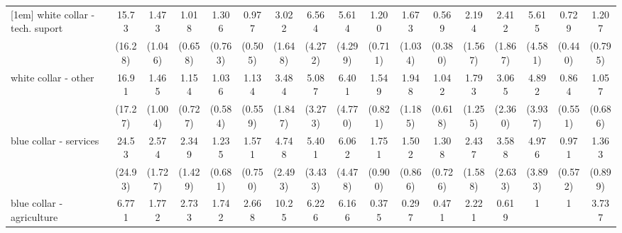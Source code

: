 {\begin{tabular}{l*{16}{c}}
[1em]
white collar - tech. suport&       15.73\sym{**} &       1.473         &       1.018         &       1.306         &       0.977         &       3.022\sym{*}  &       6.564\sym{**} &       5.614\sym{*}  &       1.200         &       1.673         &       0.569         &       2.194         &       2.412         &       5.615\sym{*}  &       0.729         &       1.207         \\
                    &     (16.28)         &     (1.046)         &     (0.658)         &     (0.763)         &     (0.505)         &     (1.648)         &     (4.272)         &     (4.299)         &     (0.711)         &     (1.034)         &     (0.380)         &     (1.567)         &     (1.867)         &     (4.581)         &     (0.440)         &     (0.795)         \\
[1em]
white collar - other&       16.91\sym{**} &       1.465         &       1.154         &       1.036         &       1.134         &       3.484\sym{*}  &       5.087\sym{*}  &       6.401\sym{*}  &       1.549         &       1.948         &       1.042         &       1.793         &       3.065         &       4.892\sym{*}  &       0.864         &       1.057         \\
                    &     (17.27)         &     (1.004)         &     (0.727)         &     (0.584)         &     (0.559)         &     (1.847)         &     (3.273)         &     (4.770)         &     (0.821)         &     (1.185)         &     (0.618)         &     (1.255)         &     (2.360)         &     (3.937)         &     (0.551)         &     (0.686)         \\
[1em]
blue collar - services&       24.53\sym{**} &       2.574         &       2.349         &       1.235         &       1.571         &       4.748\sym{**} &       5.401\sym{**} &       6.062\sym{*}  &       1.751         &       1.502         &       1.308         &       2.437         &       3.588         &       4.976\sym{*}  &       0.971         &       1.363         \\
                    &     (24.93)         &     (1.727)         &     (1.429)         &     (0.681)         &     (0.750)         &     (2.493)         &     (3.433)         &     (4.478)         &     (0.900)         &     (0.866)         &     (0.726)         &     (1.588)         &     (2.633)         &     (3.893)         &     (0.572)         &     (0.899)         \\
[1em]
blue collar - agriculture&       6.771         &       1.772         &       2.733         &       1.742         &       2.668         &       10.25\sym{**} &       6.226\sym{*}  &       6.166         &       0.375         &       0.297         &       0.471         &       2.221         &       0.619         &           1         &           1         &       3.737         \\

\end{tabular}}
